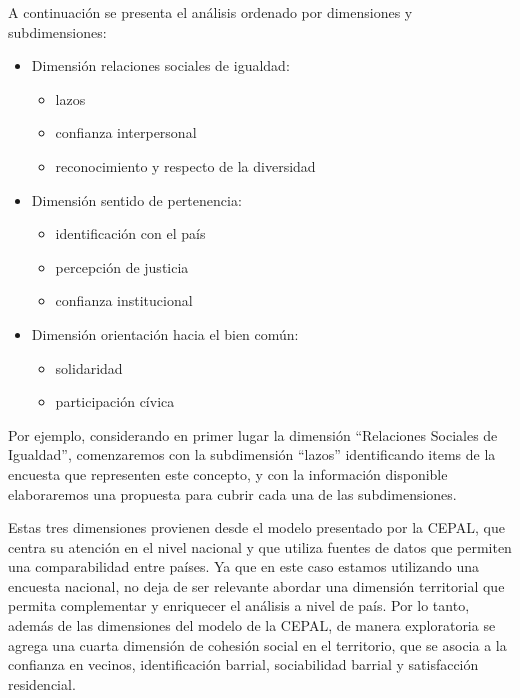 \documentclass[
  12pt,
]{book}
\providecommand{\tightlist}{%
  \setlength{\itemsep}{0pt}\setlength{\parskip}{0pt}}
\begin{document}
A continuación se presenta el análisis ordenado por dimensiones y subdimensiones:

\begin{itemize}
\tightlist
\item
  Dimensión relaciones sociales de igualdad:

  \begin{itemize}
  \tightlist
  \item
    lazos
  \item
    confianza interpersonal
  \item
    reconocimiento y respecto de la diversidad
  \end{itemize}
\item
  Dimensión sentido de pertenencia:

  \begin{itemize}
  \tightlist
  \item
    identificación con el país
  \item
    percepción de justicia
  \item
    confianza institucional
  \end{itemize}
\item
  Dimensión orientación hacia el bien común:

  \begin{itemize}
  \tightlist
  \item
    solidaridad
  \item
    participación cívica
  \end{itemize}
\end{itemize}

Por ejemplo, considerando en primer lugar la dimensión ``Relaciones Sociales de Igualdad'', comenzaremos con la subdimensión ``lazos'' identificando items de la encuesta que representen este concepto, y con la información disponible elaboraremos una propuesta para cubrir cada una de las subdimensiones.

Estas tres dimensiones provienen desde el modelo presentado por la CEPAL, que centra su atención en el nivel nacional y que utiliza fuentes de datos que permiten una comparabilidad entre países. Ya que en este caso estamos utilizando una encuesta nacional, no deja de ser relevante abordar una dimensión territorial que permita complementar y enriquecer el análisis a nivel de país. Por lo tanto, además de las dimensiones del modelo de la CEPAL, de manera exploratoria se agrega una cuarta dimensión de cohesión social en el territorio, que se asocia a la confianza en vecinos, identificación barrial, sociabilidad barrial y satisfacción residencial.
\end{document}
